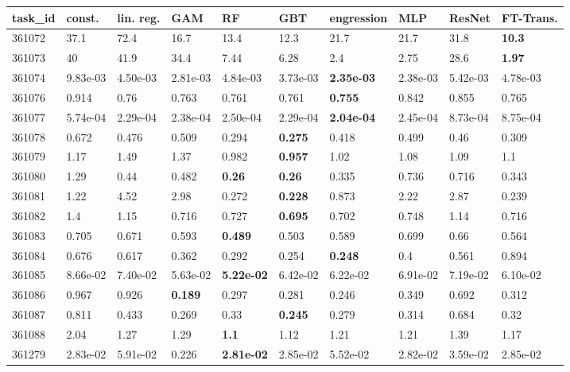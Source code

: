 \begin{table}[ht!]
\centering
\begingroup\footnotesize
\begin{tabular}{llllllllll}
  \hline
\hline
task\_id & const. & lin. reg. & GAM & RF & GBT & engression & MLP & ResNet & FT-Trans. \\ 
  \hline
361072 & 37.1 & 72.4 & 16.7 & 13.4 & 12.3 & 21.7 & 21.7 & 31.8 & \textbf{10.3} \\ 
  361073 & 40 & 41.9 & 34.4 & 7.44 & 6.28 & 2.4 & 2.75 & 28.6 & \textbf{1.97} \\ 
  361074 & 9.83e-03 & 4.50e-03 & 2.81e-03 & 4.84e-03 & 3.73e-03 & \textbf{2.35e-03} & 2.38e-03 & 5.42e-03 & 4.78e-03 \\ 
  361076 & 0.914 & 0.76 & 0.763 & 0.761 & 0.761 & \textbf{0.755} & 0.842 & 0.855 & 0.765 \\ 
  361077 & 5.74e-04 & 2.29e-04 & 2.38e-04 & 2.50e-04 & 2.29e-04 & \textbf{2.04e-04} & 2.45e-04 & 8.73e-04 & 8.75e-04 \\ 
  361078 & 0.672 & 0.476 & 0.509 & 0.294 & \textbf{0.275} & 0.418 & 0.499 & 0.46 & 0.309 \\ 
  361079 & 1.17 & 1.49 & 1.37 & 0.982 & \textbf{0.957} & 1.02 & 1.08 & 1.09 & 1.1 \\ 
  361080 & 1.29 & 0.44 & 0.482 & \textbf{0.26} & \textbf{0.26} & 0.335 & 0.736 & 0.716 & 0.343 \\ 
  361081 & 1.22 & 4.52 & 2.98 & 0.272 & \textbf{0.228} & 0.873 & 2.22 & 2.87 & 0.239 \\ 
  361082 & 1.4 & 1.15 & 0.716 & 0.727 & \textbf{0.695} & 0.702 & 0.748 & 1.14 & 0.716 \\ 
  361083 & 0.705 & 0.671 & 0.593 & \textbf{0.489} & 0.503 & 0.589 & 0.699 & 0.66 & 0.564 \\ 
  361084 & 0.676 & 0.617 & 0.362 & 0.292 & 0.254 & \textbf{0.248} & 0.4 & 0.561 & 0.894 \\ 
  361085 & 8.66e-02 & 7.40e-02 & 5.63e-02 & \textbf{5.22e-02} & 6.42e-02 & 6.22e-02 & 6.91e-02 & 7.19e-02 & 6.10e-02 \\ 
  361086 & 0.967 & 0.926 & \textbf{0.189} & 0.297 & 0.281 & 0.246 & 0.349 & 0.692 & 0.312 \\ 
  361087 & 0.811 & 0.433 & 0.269 & 0.33 & \textbf{0.245} & 0.279 & 0.314 & 0.684 & 0.32 \\ 
  361088 & 2.04 & 1.27 & 1.29 & \textbf{1.1} & 1.12 & 1.21 & 1.21 & 1.39 & 1.17 \\ 
  361279 & 2.83e-02 & 5.91e-02 & 0.226 & \textbf{2.81e-02} & 2.85e-02 & 5.52e-02 & 2.82e-02 & 3.59e-02 & 2.85e-02 \\ 

\end{tabular}
\end{table}
